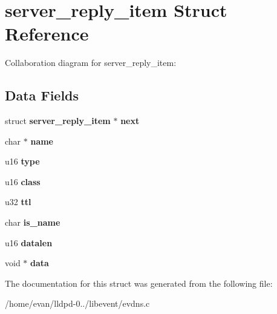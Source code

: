 \section{server\-\_\-reply\-\_\-item \-Struct \-Reference}
\label{structserver__reply__item}


\-Collaboration diagram for server\-\_\-reply\-\_\-item\-:
\subsection*{\-Data \-Fields}
\begin{DoxyCompactItemize}
\item 
struct {\bf server\-\_\-reply\-\_\-item} $\ast$ {\bfseries next}\label{structserver__reply__item_a265f0ca0c303f70e4b766065e7db127b}

\item 
char $\ast$ {\bfseries name}\label{structserver__reply__item_a5ac083a645d964373f022d03df4849c8}

\item 
u16 {\bfseries type}\label{structserver__reply__item_ab24f45bb2bee7b87f8b640d848f65471}

\item 
u16 {\bfseries class}\label{structserver__reply__item_aabe1eedd204e500ae2789a37ecf9f2dd}

\item 
u32 {\bfseries ttl}\label{structserver__reply__item_a511010d89172749e7b39d0231fa0930c}

\item 
char {\bfseries is\-\_\-name}\label{structserver__reply__item_af4fb73724bdad0f2e3d412d609c46309}

\item 
u16 {\bfseries datalen}\label{structserver__reply__item_a160eb5c77663357d4d3aa504fc338424}

\item 
void $\ast$ {\bfseries data}\label{structserver__reply__item_a735984d41155bc1032e09bece8f8d66d}

\end{DoxyCompactItemize}


\-The documentation for this struct was generated from the following file\-:\begin{DoxyCompactItemize}
\item 
/home/evan/lldpd-\/0../libevent/evdns.\-c\end{DoxyCompactItemize}
